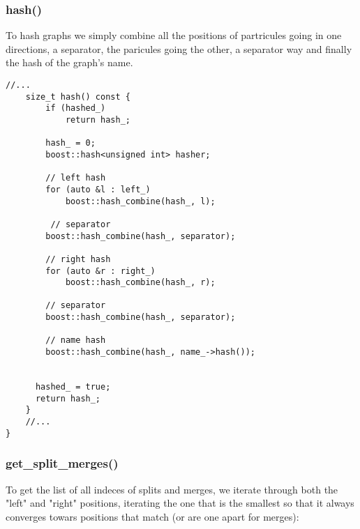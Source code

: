 \documentclass[11pt]{article}
\begin{document}
\subsubsection{hash()}

To hash graphs we simply combine all the positions of partricules going in one directions, a separator, the paricules going the other, a separator way and finally the hash of the graph's name.

\begin{lstlisting}[style=CStyle]
	//...
	size_t hash() const {
		if (hashed_)
			return hash_;

		hash_ = 0;
		boost::hash<unsigned int> hasher;

		// left hash 
		for (auto &l : left_)
			boost::hash_combine(hash_, l);

	 	 // separator 
	  	boost::hash_combine(hash_, separator);

	  	// right hash 
	  	for (auto &r : right_)
	   		boost::hash_combine(hash_, r);

	  	// separator 
	  	boost::hash_combine(hash_, separator);

	  	// name hash 
	  	boost::hash_combine(hash_, name_->hash());
			

	  hashed_ = true;
	  return hash_;
	}
	//...
}
\end{lstlisting}

\subsubsection{get\_split\_merges()}

To get the list of all indeces of splits and merges, we iterate through both the "left" and "right" positions, iterating the one that is the smallest so that it always converges towars positions that match (or are one apart for merges):
\end{document}
